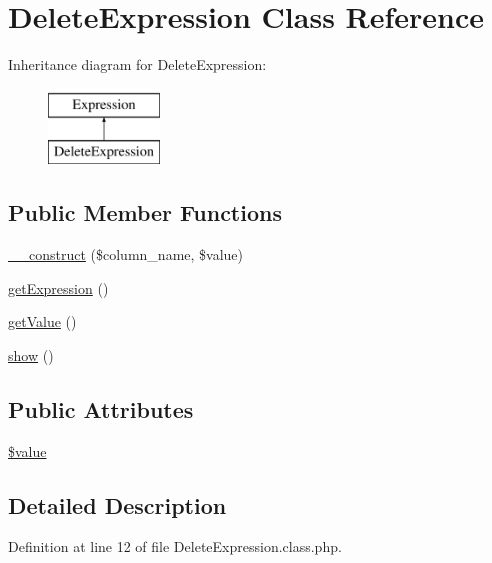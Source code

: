\hypertarget{classDeleteExpression}{\section{Delete\-Expression Class Reference}
\label{classDeleteExpression}
}
Inheritance diagram for Delete\-Expression\-:\begin{figure}[H]
\begin{center}
\leavevmode
\includegraphics[height=2.000000cm]{classDeleteExpression}
\end{center}
\end{figure}
\subsection*{Public Member Functions}
\begin{DoxyCompactItemize}
\item 
\hyperlink{classDeleteExpression_a7e60bbe46b263418a4b3e7c18379ad86}{\-\_\-\-\_\-construct} (\$column\-\_\-name, \$value)
\item 
\hyperlink{classDeleteExpression_acf2477afffe27b73797829c852431aec}{get\-Expression} ()
\item 
\hyperlink{classDeleteExpression_a37759c2867e64b62368539706fdf9a43}{get\-Value} ()
\item 
\hyperlink{classDeleteExpression_a6e7d4bdf884830a90e0ed0aba7619f67}{show} ()
\end{DoxyCompactItemize}
\subsection*{Public Attributes}
\begin{DoxyCompactItemize}
\item 
\hyperlink{classDeleteExpression_a8e5b6ee335281d42c6e40a462b83cf64}{\$value}
\end{DoxyCompactItemize}


\subsection{Detailed Description}


Definition at line 12 of file Delete\-Expression.\-class.\-php.



